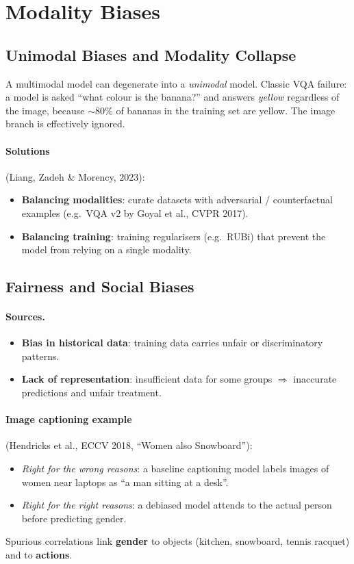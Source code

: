 \documentclass[11pt,a4paper]{article}
\theoremstyle{definition}
\theoremstyle{plain}
\theoremstyle{remark}
\begin{document}
\section{Modality Biases}

\subsection{Unimodal Biases and Modality Collapse}

A multimodal model can degenerate into a \emph{unimodal} model. Classic VQA failure: a model is asked ``what colour is the banana?'' and answers \emph{yellow} regardless of the image, because $\sim 80\%$ of bananas in the training set are yellow. The image branch is effectively ignored.

\paragraph{Solutions} (Liang, Zadeh \& Morency, 2023):
\begin{itemize}
    \item \textbf{Balancing modalities}: curate datasets with adversarial / counterfactual examples (e.g.\ VQA v2 by Goyal et al., CVPR 2017).
    \item \textbf{Balancing training}: training regularisers (e.g.\ RUBi) that prevent the model from relying on a single modality.
\end{itemize}

\subsection{Fairness and Social Biases}

\paragraph{Sources.}
\begin{itemize}
    \item \textbf{Bias in historical data}: training data carries unfair or discriminatory patterns.
    \item \textbf{Lack of representation}: insufficient data for some groups $\Rightarrow$ inaccurate predictions and unfair treatment.
\end{itemize}

\paragraph{Image captioning example} (Hendricks et al., ECCV 2018, ``Women also Snowboard''):
\begin{itemize}
    \item \emph{Right for the wrong reasons}: a baseline captioning model labels images of women near laptops as ``a man sitting at a desk''.
    \item \emph{Right for the right reasons}: a debiased model attends to the actual person before predicting gender.
\end{itemize}
Spurious correlations link \textbf{gender} to objects (kitchen, snowboard, tennis racquet) and to \textbf{actions}.
\end{document}
